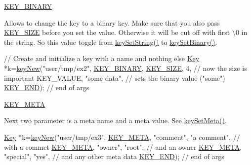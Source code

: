\begin{DoxyItemize}
\item \hyperlink{group__key_gga91fb3178848bd682000958089abbaf40a1ca18d4e094ae7487d35ecedda2235ff}{K\-E\-Y\-\_\-\-B\-I\-N\-A\-R\-Y} \par
 Allows to change the key to a binary key. Make sure that you also pass \hyperlink{group__key_gga91fb3178848bd682000958089abbaf40a6d531b5c41445d19d0452eebdccbfa01}{K\-E\-Y\-\_\-\-S\-I\-Z\-E} before you set the value. Otherwise it will be cut off with first \textbackslash{}0 in the string. So this value toggle from \hyperlink{group__keyvalue_ga622bde1eb0e0c4994728331326340ef2}{key\-Set\-String()} to \hyperlink{group__keyvalue_gaa50a5358fd328d373a45f395fa1b99e7}{key\-Set\-Binary()}. 
\begin{DoxyCodeInclude}
\textcolor{comment}{// Create and initialize a key with a name and nothing else}
\hyperlink{classkdb_1_1Key_a5679f5cae63caddd64a60388b9cc77fa}{Key} *k=\hyperlink{group__key_gad23c65b44bf48d773759e1f9a4d43b89}{keyNew}(\textcolor{stringliteral}{"user/tmp/ex2"},
        \hyperlink{group__key_gga91fb3178848bd682000958089abbaf40a1ca18d4e094ae7487d35ecedda2235ff}{KEY\_BINARY},
        \hyperlink{group__key_gga91fb3178848bd682000958089abbaf40a6d531b5c41445d19d0452eebdccbfa01}{KEY\_SIZE}, 4,               \textcolor{comment}{// now the size is important}
        KEY\_VALUE, \textcolor{stringliteral}{"some data"},    \textcolor{comment}{// sets the binary value ("some")}
        \hyperlink{group__key_gga91fb3178848bd682000958089abbaf40aa8adb6fcb92dec58fb19410eacfdd403}{KEY\_END});                  \textcolor{comment}{// end of args}
\end{DoxyCodeInclude}

\item \hyperlink{group__key_gga91fb3178848bd682000958089abbaf40a040582834bb2d90049947d7ef74e87e2}{K\-E\-Y\-\_\-\-M\-E\-T\-A} \par
 Next two parameter is a meta name and a meta value. See \hyperlink{group__keymeta_gae1f15546b234ffb6007d8a31178652b9}{key\-Set\-Meta()}. 
\begin{DoxyCodeInclude}
\hyperlink{classkdb_1_1Key_a5679f5cae63caddd64a60388b9cc77fa}{Key} *k=\hyperlink{group__key_gad23c65b44bf48d773759e1f9a4d43b89}{keyNew}(\textcolor{stringliteral}{"user/tmp/ex3"},
        \hyperlink{group__key_gga91fb3178848bd682000958089abbaf40a040582834bb2d90049947d7ef74e87e2}{KEY\_META}, \textcolor{stringliteral}{"comment"}, \textcolor{stringliteral}{"a comment"},  \textcolor{comment}{// with a commet}
        \hyperlink{group__key_gga91fb3178848bd682000958089abbaf40a040582834bb2d90049947d7ef74e87e2}{KEY\_META}, \textcolor{stringliteral}{"owner"}, \textcolor{stringliteral}{"root"},         \textcolor{comment}{// and an owner}
        \hyperlink{group__key_gga91fb3178848bd682000958089abbaf40a040582834bb2d90049947d7ef74e87e2}{KEY\_META}, \textcolor{stringliteral}{"special"}, \textcolor{stringliteral}{"yes"},        \textcolor{comment}{// and any other meta data}
        \hyperlink{group__key_gga91fb3178848bd682000958089abbaf40aa8adb6fcb92dec58fb19410eacfdd403}{KEY\_END});                  \textcolor{comment}{// end of args}
\end{DoxyCodeInclude}


\end{DoxyItemize}
